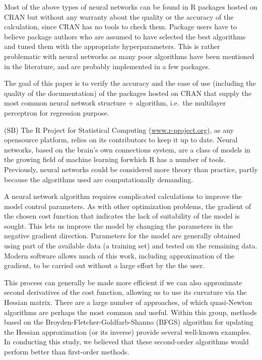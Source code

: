 Most of the above types of neural networks can be found in R packages
hosted on CRAN but without any warranty about the quality or the
accuracy of the calculation, since CRAN has no tools to check them.
Package users have to believe package authors who are assumed to have
selected the best algorithms and tuned them with the appropriate
hyperparameters. This is rather problematic with neural networks as many
poor algorithms have been mentioned in the literature, and are probably
implemented in a few packages.

The goal of this paper is to verify the accuracy and the ease of use
(including the quality of the documentation) of the packages hosted on
CRAN that supply the most common neural network structure + algorithm,
i.e.~the multilayer perceptron for regression purpose.

(SB) The R Project for Statistical Computing (\url{www.r-project.org}),
as any opensource platform, relies on its contributors to keep it up to
date. Neural networks, based on the brain's own connections system, are
a class of models in the growing field of machine learning forwhich R
has a number of tools. Previously, neural networks could be considered
more theory than practice, partly because the algorithms used are
computationally demanding.

A neural network algorithm requires complicated calculations to improve
the model control parameters. As with other optimization problems, the
gradient of the chosen cost function that indicates the lack of
suitability of the model is sought. This lets us improve the model by
changing the parameters in the negative gradient direction. Parameters
for the model are generally obtained using part of the available data (a
training set) and tested on the remaining data. Modern software allows
much of this work, including approximation of the gradient, to be
carried out without a large effort by the the user.

This process can generally be made more efficient if we can also
approximate second derivatives of the cost function, allowing us to use
its curvature via the Hessian matrix. There are a large number of
approaches, of which quasi-Newton algorithms are perhaps the most common
and useful. Within this group, methods based on the
Broyden-Fletcher-Goldfarb-Shanno (BFGS) algorithm for updating the
Hessian approximation (or its inverse) provide several well-known
examples. In conducting this study, we believed that these second-order
algorithms would perform better than first-order methods.

